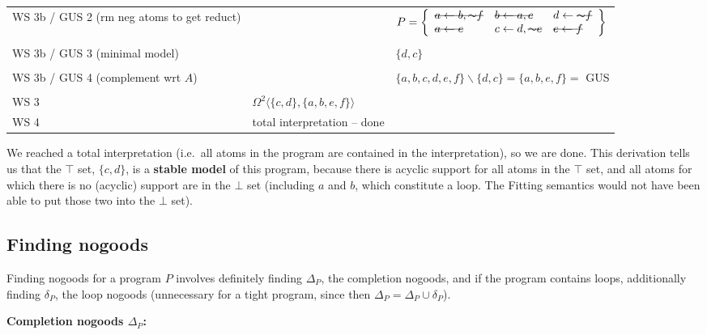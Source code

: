\documentclass[9pt,a4paper,landscape]{article}
\newcommand{\msout}[1]{\text{\sout{$#1$}}}
\begin{document}
{\begin{center}
\begin{tabular}{p{5cm}p{5cm}p{7cm}}
		WS 3b / GUS 2 (rm neg atoms to get reduct) 
		& 
		& $P = \left\{\begin{array}{lll}
		\msout{a \leftarrow b, {\sim} f} & \msout{b \leftarrow a, c} & d \leftarrow \msout{{\sim} f}\\
		\msout{a \leftarrow e} & c \leftarrow d, \msout{{\sim} e} & \msout{e \leftarrow f}
		\end{array}\right\}$ \\ &\\
		WS 3b / GUS 3 (minimal model) 
		& 
		& $\{ d, c \}$ \\ &\\
		WS 3b / GUS 4 (complement wrt $A$) 
		&
		&  $\{a, b, c, d, e, f\} \backslash \{d, c\} = \{a, b, e, f\} = $ GUS  \\&\\
		WS 3 
		& $\Omega^2 \langle \{c, d\}, \{a, b, e, f\} \rangle$& \\ \midrule
		WS 4 & total interpretation -- done & \\ \midrule
	\end{tabular}
\end{center}

We reached a total interpretation (i.e.\ all atoms in the program are contained in the interpretation), so we are done.
This derivation tells us that the $\top$ set, $\{c, d\}$, is a \textbf{stable model} of this program, because there is acyclic support for all atoms in the $\top$ set, and all atoms for which there is no (acyclic) support are in the $\bot$ set (including $a$ and $b$, which constitute a loop. The Fitting semantics would not have been able to put those two into the $\bot$ set).

\pagebreak


\subsection{Finding nogoods}
\label{subsec:ng}

Finding nogoods for a program $P$ involves definitely finding $\Delta_P$, the completion nogoods, and if the program contains loops, additionally finding $\delta_P$, the loop nogoods (unnecessary for a tight program, since then $\Delta_P = \Delta_P \cup \delta_P$).

\vspace{\baselineskip}
\textbf{Completion nogoods $\Delta_P$:}

}
\end{document}
